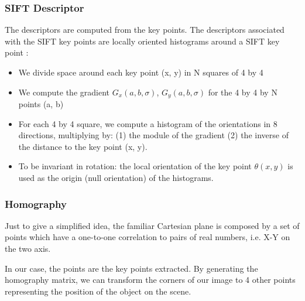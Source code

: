 	\subsubsection[Descriptor]{SIFT Descriptor}
	\par The descriptors are computed from the key points. The descriptors associated with the SIFT key points are locally oriented histograms around a SIFT key point \cite{AM}:
	
	\begin{itemize}
			\item We divide space around each key point (x, y) in N squares of 4 by 4 \item We compute the gradient \begin{math}G_{x}(a,b,\sigma)\end{math}, \begin{math}G_{y}(a,b,\sigma)\end{math} for the 4 by 4 by N points (a, b)

		\item For each 4 by 4 square, we compute a histogram of the orientations in 8 directions, multiplying by: (1) the module of the gradient (2) the inverse of the distance to the key point (x, y).
 \item To be invariant in rotation: the local orientation of the key point \begin{math} \theta(x,y) \end{math} is used as the origin (null orientation) of the histograms.		
	\end{itemize}
	
	
	\subsubsection{Homography}
	\par  Just to give a simplified idea, the familiar Cartesian plane is composed by a set of points which have a one-to-one correlation to pairs of real numbers, i.e. X-Y on the two axis\cite{Homography}.
	\par In our case, the points are the key points extracted. By generating the homography matrix, we can transform the corners of our image to 4 other points representing the position of the object on the scene\cite{TutoHomography}.
	
